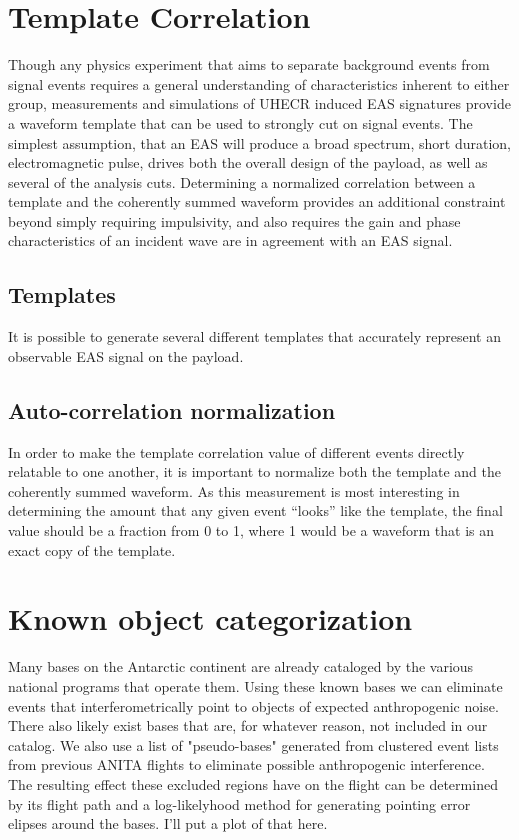 \section{Template Correlation}
	Though any physics experiment that aims to separate background events from signal events requires a general understanding of characteristics inherent to either group, measurements and simulations of UHECR induced EAS signatures provide a waveform template that can be used to strongly cut on signal events.  The simplest assumption, that an EAS will produce a broad spectrum, short duration, electromagnetic pulse, drives both the overall design of the payload, as well as several of the analysis cuts.  Determining a normalized correlation between a template and the coherently summed waveform provides an additional constraint beyond simply requiring impulsivity, and also requires the gain and phase characteristics of an incident wave are in agreement with an EAS signal.
	
	\subsection{Templates}
		It is possible to generate several different templates that accurately represent an observable EAS signal on the payload.
	
	\subsection{Auto-correlation normalization}
		In order to make the template correlation value of different events directly relatable to one another, it is important to normalize both the template and the coherently summed waveform.  As this measurement is most interesting in determining the amount that any given event ``looks'' like the template, the final value should be a fraction from 0 to 1, where 1 would be a waveform that is an exact copy of the template.  


\section{Known object categorization}
	Many bases on the Antarctic continent are already cataloged by the various national programs that operate them.  Using these known bases we can eliminate events that interferometrically point to objects of expected anthropogenic noise.  There also likely exist bases that are, for whatever reason, not included in our catalog.  We also use a list of "pseudo-bases" generated from clustered event lists from previous ANITA flights to eliminate possible anthropogenic interference.  The resulting effect these excluded regions have on the flight can be determined by its flight path and a log-likelyhood method for generating pointing error elipses around the bases.  I'll put a plot of that here.
